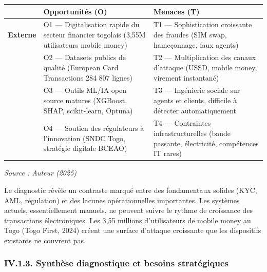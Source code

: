 \documentclass[
  12pt,
]{article}
\newcounter{none} %
\begin{document}
{\def\LTcaptype{none} %
\begin{longtable}[]{@{}
  >{\raggedright\arraybackslash}p{}
  >{\raggedright\arraybackslash}p{}
  >{\raggedright\arraybackslash}p{}@{}}
\toprule\noalign{}
\begin{minipage}[b]{\linewidth}\raggedright
\end{minipage} & \begin{minipage}[b]{\linewidth}\raggedright
Opportunités (O)
\end{minipage} & \begin{minipage}[b]{\linewidth}\raggedright
Menaces (T)
\end{minipage} \\
\midrule\noalign{}
\endhead
\bottomrule\noalign{}
\endlastfoot
\textbf{Externe} & O1 — Digitalisation rapide du secteur financier
togolais (3,55M utilisateurs mobile money) & T1 — Sophistication
croissante des fraudes (SIM swap, hameçonnage, faux agents) \\
& O2 — Datasets publics de qualité (European Card Transactions 284 807
lignes) & T2 — Multiplication des canaux d’attaque (USSD, mobile money,
virement instantané) \\
& O3 — Outils ML/IA open source matures (XGBoost, SHAP, scikit-learn,
Optuna) & T3 — Ingénierie sociale sur agents et clients, difficile à
détecter automatiquement \\
& O4 — Soutien des régulateurs à l’innovation (SNDC Togo, stratégie
digitale BCEAO) & T4 — Contraintes infrastructurelles (bande passante,
électricité, compétences IT rares) \\
\end{longtable}
}

\emph{Source : Auteur (2025)}

Le diagnostic révèle un contraste marqué entre des fondamentaux solides
(KYC, AML, régulation) et des lacunes opérationnelles importantes. Les
systèmes actuels, essentiellement manuels, ne peuvent suivre le rythme
de croissance des transactions électroniques. Les 3,55 millions
d’utilisateurs de mobile money au Togo (Togo First, 2024) créent une
surface d’attaque croissante que les dispositifs existants ne couvrent
pas.

\subsubsection{IV.1.3. Synthèse diagnostique et besoins
stratégiques}\label{iv.1.3.-synthuxe8se-diagnostique-et-besoins-stratuxe9giques}
\end{document}
